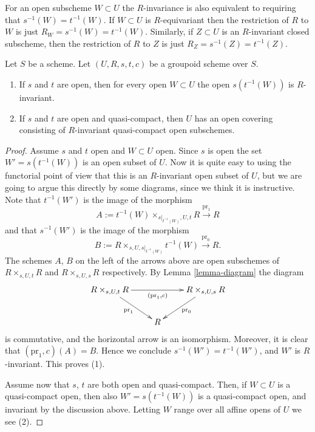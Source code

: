 \noindent
For an open subscheme $W \subset U$ the $R$-invariance
is also equivalent to requiring that $s^{-1}(W) = t^{-1}(W)$.
If $W \subset U$ is $R$-equivariant then the restriction of $R$ to
$W$ is just $R_W = s^{-1}(W) = t^{-1}(W)$. Similarly, if $Z \subset U$
is an $R$-invariant closed subscheme, then the restriction of $R$
to $Z$ is just $R_Z = s^{-1}(Z) = t^{-1}(Z)$.

\begin{lemma}
\label{lemma-constructing-invariant-opens}
Let $S$ be a scheme.
Let $(U, R, s, t, c)$ be a groupoid scheme over $S$.
\begin{enumerate}
\item If $s$ and $t$ are open, then for every open $W \subset U$
the open $s(t^{-1}(W))$ is $R$-invariant.
\item If $s$ and $t$ are open and quasi-compact, then $U$ has an open
covering consisting of $R$-invariant quasi-compact open subschemes.
\end{enumerate}
\end{lemma}

\begin{proof}
Assume $s$ and $t$ open and $W \subset U$ open.
Since $s$ is open the set $W' = s(t^{-1}(W))$ is an open subset of $U$.
Now it is quite easy to using the functorial point of view
that this is an $R$-invariant open subset of $U$, but we are going to argue
this directly by some diagrams, since we think it is instructive.
Note that $t^{-1}(W')$ is the image of the morphism
$$
A := t^{-1}(W) \times_{s|_{t^{-1}(W)}, U, t} R
\xrightarrow{\text{pr}_1} R
$$
and that $s^{-1}(W')$ is the image of the morphism
$$
B := R \times_{s, U, s|_{t^{-1}(W)}} t^{-1}(W)
\xrightarrow{\text{pr}_0} R.
$$
The schemes $A$, $B$ on the left of the arrows above are open subschemes of
$R \times_{s, U, t} R$ and $R \times_{s, U, s} R$ respectively.
By Lemma \ref{lemma-diagram} the diagram
$$
\xymatrix{
R \times_{s, U, t} R \ar[rd]_{\text{pr}_1} \ar[rr]_{(\text{pr}_1, c)} & &
R \times_{s, U, s} R \ar[ld]^{\text{pr}_0} \\
& R &
}
$$
is commutative, and the horizontal arrow is an isomorphism. Moreover, it is
clear that $(\text{pr}_1, c)(A) = B$. Hence we conclude
$s^{-1}(W') = t^{-1}(W')$, and $W'$ is $R$-invariant. This proves (1).

\medskip\noindent
Assume now that $s$, $t$ are both open and quasi-compact.
Then, if $W \subset U$ is a quasi-compact open, then also
$W' = s(t^{-1}(W))$ is a quasi-compact open, and invariant by the
discussion above. Letting $W$ range over all affine opens of $U$
we see (2).
\end{proof}





